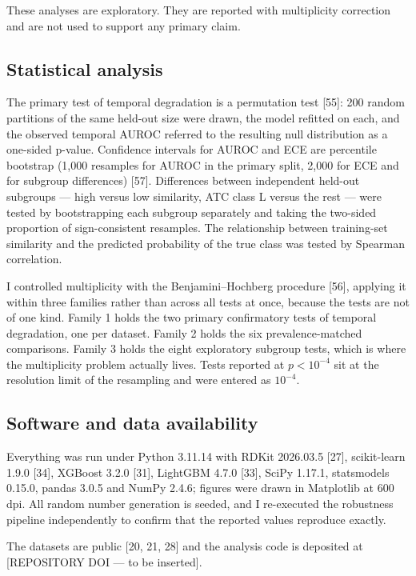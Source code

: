 \documentclass[pdflatex,sn-basic,Numbered,referee,lineno]{sn-jnl}%
\theoremstyle{thmstyleone}%
\theoremstyle{thmstyletwo}%
\theoremstyle{thmstylethree}%
\begin{document}
These analyses are exploratory. They are reported with multiplicity correction and are not used to support any primary claim.

\subsection{Statistical analysis}

The primary test of temporal degradation is a permutation test [55]: 200 random partitions of the same held-out size were drawn, the model refitted on each, and the observed temporal AUROC referred to the resulting null distribution as a one-sided p-value. Confidence intervals for AUROC and ECE are percentile bootstrap (1,000 resamples for AUROC in the primary split, 2,000 for ECE and for subgroup differences) [57]. Differences between independent held-out subgroups --- high versus low similarity, ATC class L versus the rest --- were tested by bootstrapping each subgroup separately and taking the two-sided proportion of sign-consistent resamples. The relationship between training-set similarity and the predicted probability of the true class was tested by Spearman correlation.

I controlled multiplicity with the Benjamini--Hochberg procedure [56], applying it within three families rather than across all tests at once, because the tests are not of one kind. Family 1 holds the two primary confirmatory tests of temporal degradation, one per dataset. Family 2 holds the six prevalence-matched comparisons. Family 3 holds the eight exploratory subgroup tests, which is where the multiplicity problem actually lives. Tests reported at $p < 10^{-4}$ sit at the resolution limit of the resampling and were entered as $10^{-4}$.

\subsection{Software and data availability}

Everything was run under Python 3.11.14 with RDKit 2026.03.5 [27], scikit-learn 1.9.0 [34], XGBoost 3.2.0 [31], LightGBM 4.7.0 [33], SciPy 1.17.1, statsmodels 0.15.0, pandas 3.0.5 and NumPy 2.4.6; figures were drawn in Matplotlib at 600 dpi. All random number generation is seeded, and I re-executed the robustness pipeline independently to confirm that the reported values reproduce exactly.

The datasets are public [20, 21, 28] and the analysis code is deposited at [REPOSITORY DOI --- to be inserted].
\end{document}
